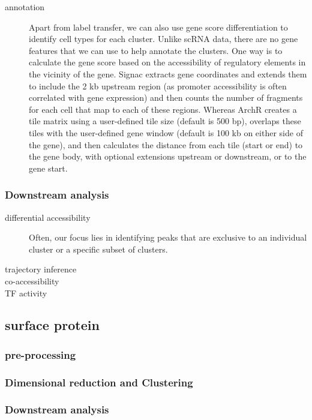 \begin{description}
	 \item[annotation] 
	Apart from label transfer, we can also use gene score differentiation to identify cell types for each cluster. Unlike scRNA data, there are no gene features that we can use to help annotate the clusters. One way is to calculate the gene score based on the accessibility of regulatory elements in the vicinity of the gene. Signac extracts gene coordinates and extends them to include the 2 kb upstream region (as promoter accessibility is often correlated with gene expression) and then counts the number of fragments for each cell that map to each of these regions. Whereas ArchR creates a tile matrix using a user-defined tile size (default is 500 bp), overlaps these tiles with the user-defined gene window (default is 100 kb on either side of the gene), and then calculates the distance from each tile (start or end) to the gene body, with optional extensions upstream or downstream, or to the gene start.
\end{description}
\subsubsection{Downstream analysis}
\begin{description}
	\item[differential accessibility] Often, our focus lies in identifying peaks that are exclusive to an individual cluster or a specific subset of clusters. 
	\item[trajectory inference]
	\item[co-accessibility]
	\item[TF activity]   
\end{description}

\subsection{surface protein}
\subsubsection{pre-processing}
\subsubsection{Dimensional reduction and Clustering}
\subsubsection{Downstream analysis}


